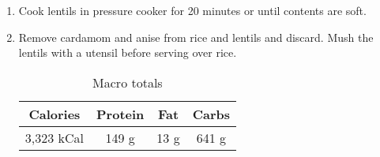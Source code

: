 \begin{multicols}{2}
\begin{enumerate}
\item Cook lentils in pressure cooker for 20 minutes or until contents are soft. 
\item Remove cardamom and anise from rice and lentils and discard. Mush the lentils with a utensil before serving over rice. 


\begin{table}[H]
  \begin{center}
    \caption{Macro totals}
    \label{tab:table1}
    \begin{tabular}{c|c|c|c} %
      \textbf{Calories} & \textbf{Protein} & \textbf{Fat} & \textbf{Carbs}\\
      \hline
      3,323 kCal & 149 g & 13 g & 641 g\\
    \end{tabular}
  \end{center}
\end{table}
 
\end{enumerate}
\end{multicols}